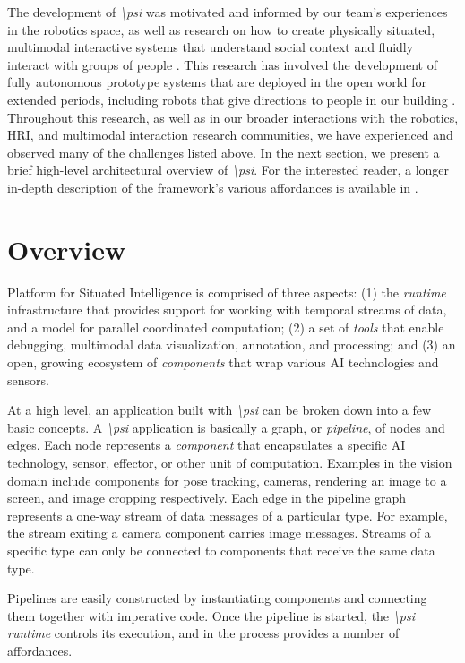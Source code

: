 \documentclass[letterpaper]{article} %
\newcommand{\psif}{\emph{\textbackslash psi} }
\newcommand{\psifnospace}{\emph{\textbackslash psi}}
\begin{document}
The development of \psif was motivated and informed by our team's experiences in the robotics space, as well as research on how to create physically situated, multimodal interactive systems that understand social context and fluidly interact with groups of people \cite{bohus2009models,bohus2011,andrist2016you,bohus2017study,tan2020now}. This research has involved the development of fully autonomous prototype systems that are deployed in the open world for extended periods, including robots that give directions to people in our building \cite{bohus2014directions}. Throughout this research, as well as in our broader interactions with the robotics, HRI, and multimodal interaction research communities, we have experienced and observed many of the challenges listed above. In the next section, we present a brief high-level architectural overview of \psifnospace. For the interested reader, a longer in-depth description of the framework's various affordances is available in \cite{bohus2020psi}.

\section{Overview}

Platform for Situated Intelligence is comprised of three aspects: (1) the \textit{runtime} infrastructure that provides support for working with temporal streams of data, and a model for parallel coordinated computation; (2) a set of \textit{tools} that enable debugging, multimodal data visualization, annotation, and processing; and (3) an open, growing ecosystem of \textit{components} that wrap various AI technologies and sensors.

At a high level, an application built with \psif can be broken down into a few basic concepts. A \psif application is basically a graph, or \emph{pipeline}, of nodes and edges. Each node represents a \emph{component} that encapsulates a specific AI technology, sensor, effector, or other unit of computation. Examples in the vision domain include components for pose tracking, cameras, rendering an image to a screen, and image cropping respectively. Each edge in the pipeline graph represents a one-way stream of data messages of a particular type. For example, the stream exiting a camera component carries image messages. Streams of a specific type can only be connected to components that receive the same data type.

Pipelines are easily constructed by instantiating components and connecting them together with imperative code. Once the pipeline is started, the \psif \emph{runtime} controls its execution, and in the process provides a number of affordances.
\end{document}
